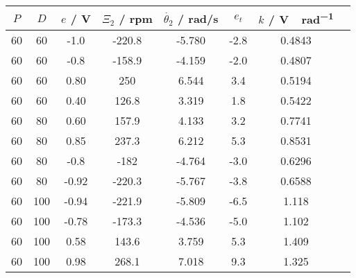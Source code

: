 \begin{table}[!ht]
	\centering
	\begin{tabular}{cccccccc}
		\hline
		$P$ & $D$ & $e$ / \si{\volt} & $\Xi_2$ / rpm & $\dot{\theta_2}$ / rad/s & $e_t$ & $k$ / \si{\volt\sec\per\radian} \\ \hline
		60  & 60  & -1.0             & -220.8        & -5.780                   & -2.8  & 0.4843                          \\
		60  & 60  & -0.8             & -158.9        & -4.159                   & -2.0  & 0.4807                          \\
		60  & 60  & 0.80             & 250           & 6.544                    & 3.4   & 0.5194                          \\
		60  & 60  & 0.40             & 126.8         & 3.319                    & 1.8   & 0.5422                          \\
		60  & 80  & 0.60             & 157.9         & 4.133                    & 3.2   & 0.7741                          \\
		60  & 80  & 0.85             & 237.3         & 6.212                    & 5.3   & 0.8531                          \\
		60  & 80  & -0.8             & -182          & -4.764                   & -3.0  & 0.6296                          \\
		60  & 80  & -0.92            & -220.3        & -5.767                   & -3.8  & 0.6588                          \\
		60  & 100 & -0.94            & -221.9        & -5.809                   & -6.5  & 1.118                           \\
		60  & 100 & -0.78            & -173.3        & -4.536                   & -5.0  & 1.102                           \\
		60  & 100 & 0.58             & 143.6         & 3.759                    & 5.3   & 1.409                           \\
		60  & 100 & 0.98             & 268.1         & 7.018                    & 9.3   & 1.325                           \\ \hline
	\end{tabular}
\end{table}
